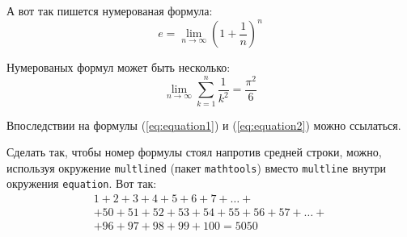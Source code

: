 А вот так пишется нумерованая формула:
\begin{equation}
  \label{eq:equation1}
  e = \lim_{n \to \infty} \left( 1+\frac{1}{n} \right) ^n
\end{equation}

Нумерованых формул может быть несколько:
\begin{equation}
  \label{eq:equation2}
  \lim_{n \to \infty} \sum_{k=1}^n \frac{1}{k^2} = \frac{\pi^2}{6}
\end{equation}

Впоследствии на формулы (\ref{eq:equation1}) и (\ref{eq:equation2}) можно ссылаться.

Сделать так, чтобы номер формулы стоял напротив средней строки, можно, используя окружение \verb|multlined| (пакет \verb|mathtools|) вместо \verb|multline| внутри окружения \verb|equation|. Вот так:
\begin{equation} %
    \begin{multlined}
        1+ 2+3+4+5+6+7+\dots + \\ 
        + 50+51+52+53+54+55+56+57 + \dots + \\ 
        + 96+97+98+99+100=5050 
    \end{multlined}
\end{equation}
